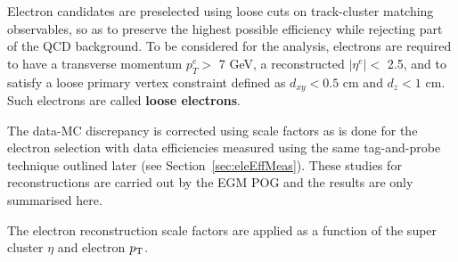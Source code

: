 
Electron candidates are preselected using loose cuts on track-cluster matching observables, so as to preserve the highest possible efficiency while rejecting part of the QCD background. To be considered for the analysis, electrons are required to have a
transverse momentum $p^e_T >$ 7 GeV, a reconstructed $|\eta^e| <$ 2.5, and to satisfy a loose primary vertex 
constraint defined as $d_{xy} < 0.5$ cm and $d_z < 1$ cm.
Such electrons are called {\bf loose electrons}.

The data-MC discrepancy is corrected using scale factors as is done for the electron selection with data efficiencies measured using the same tag-and-probe technique outlined later (see Section~\ref{sec:eleEffMeas}). 
These studies for reconstructions are carried out by the EGM POG and the results are only summarised here.

The electron reconstruction scale factors 
are applied as a function of the super cluster $\eta$ and electron $p_{\mathrm{T}}$.


